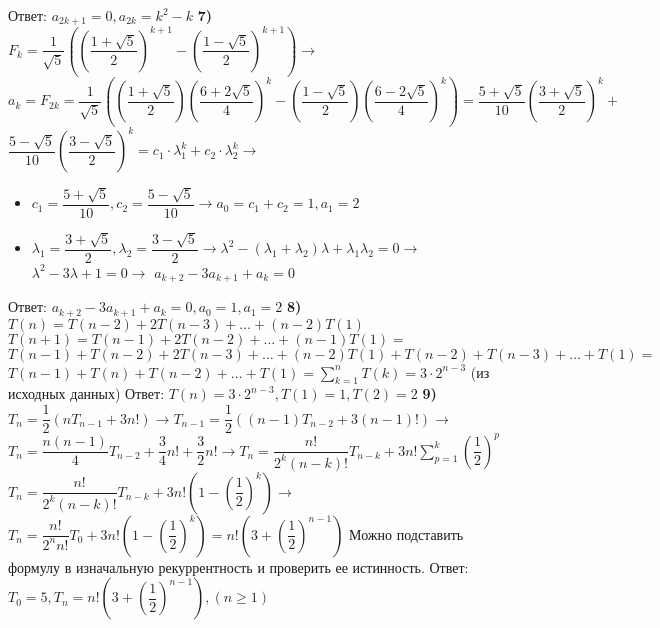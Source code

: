 \documentclass[12pt,a4paper,fleqn]{article}
\begin{document}
Ответ: $a_{2k+1} = 0, a_{2k} = k^2 - k$ \newline \newline
{\bf 7)} $F_k = \dfrac{1}{\sqrt{5}} \left( \left( \dfrac{1 + \sqrt{5}}{2} \right)^{k + 1} - \left( \dfrac{1 - \sqrt{5}}{2} \right)^{k + 1} \right) \rightarrow$ \newline
$a_k = F_{2k} = \dfrac{1}{\sqrt{5}} \left( \left( \dfrac{1 + \sqrt{5}}{2} \right) \left( \dfrac{6 + 2\sqrt{5}}{4} \right)^{k} - \left( \dfrac{1 - \sqrt{5}}{2} \right) \left( \dfrac{6 - 2\sqrt{5}}{4} \right)^{k} \right) = \dfrac{5 + \sqrt{5}}{10} \left( \dfrac{3 + \sqrt{5}}{2} \right)^k + $ \newline
$\dfrac{5 - \sqrt{5}}{10} \left( \dfrac{3 - \sqrt{5}}{2} \right)^k = c_1 \cdot \lambda_1^k + c_2 \cdot \lambda_2^k \rightarrow$
\begin{itemize}
\item $c_1 = \dfrac{5 + \sqrt{5}}{10}, c_2 = \dfrac{5 - \sqrt{5}}{10} \rightarrow a_0 = c_1 + c_2 = 1, a_1 = 2$
\item $\lambda_1 = \dfrac{3 + \sqrt{5}}{2}, \lambda_2 = \dfrac{3 - \sqrt{5}}{2} \rightarrow \lambda^2 - (\lambda_1 + \lambda_2) \lambda + \lambda_1 \lambda_2 = 0 \rightarrow$ \newline
$\lambda^2 - 3\lambda + 1 = 0 \rightarrow$ \newline
$a_{k + 2} - 3a_{k + 1} + a_{k} = 0$
\end{itemize}
Ответ: $a_{k + 2} - 3a_{k + 1} + a_{k} = 0, a_0 = 1, a_1 = 2$ \newline \newline
{\bf 8)} $T(n) = T(n -2) + 2T(n-3) + \ldots + (n - 2)T(1)$ \newline
$T(n + 1) = T(n - 1) + 2T(n - 2) + \ldots + (n - 1)T(1) =$ \newline
$T(n - 1) + T(n - 2) + 2T(n - 3) + \ldots + (n - 2)T(1) + T(n - 2) + T(n - 3) + \ldots + T(1) =$ \newline
$T(n - 1) + T(n) + T(n - 2) + \ldots + T (1) = \sum_{k = 1}^n T(k) = 3 \cdot 2^{n - 3}$ (из исходных данных) \newline
Ответ: $T(n) = 3 \cdot 2^{n - 3}, T(1) = 1, T(2) = 2$ \newline \newline
{\bf 9)} $T_n = \dfrac{1}{2} (nT_{n - 1} + 3n!) \rightarrow T_{n - 1} = \dfrac{1}{2} ((n-1)T_{n - 2} + 3(n-1)!) \rightarrow$ \newline
$T_n = \dfrac{n(n - 1)}{4}T_{n - 2} + \dfrac{3}{4}n! + \dfrac{3}{2}n! \rightarrow T_n = \dfrac{n!}{2^k (n - k)!} T_{n - k} + 3 n! \sum_{p = 1}^k \left( \dfrac{1}{2} \right)^p$ \newline
$T_n = \dfrac{n!}{2^k (n - k)!} T_{n - k} + 3n!(1 - \left( \dfrac{1}{2} \right)^k) \rightarrow$ \newline
$T_n = \dfrac{n!}{2^n n!}T_0 + 3n!(1 - \left( \dfrac{1}{2} \right)^k) = n!(3 + \left( \dfrac{1}{2} \right)^{n - 1})$ Можно подставить формулу в изначальную рекуррентность и проверить ее истинность. \newline
Ответ: $T_0 = 5, T_n = n!(3 + \left( \dfrac{1}{2} \right)^{n - 1}), (n \geqslant 1)$ \newline \newline
\end{document}
